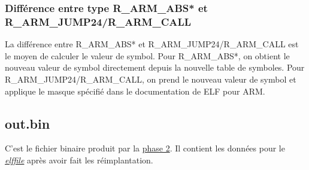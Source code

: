 \documentclass[a4paper]{article} %
\begin{document}
\subsubsection*{Différence entre type R\_ARM\_ABS* et  R\_ARM\_JUMP24/R\_ARM\_CALL}
\label{sec:calc}

La différence entre R\_ARM\_ABS* et R\_ARM\_JUMP24/R\_ARM\_CALL est le moyen de 
calculer le valeur de symbol. Pour R\_ARM\_ABS*, on obtient le nouveau valeur de 
symbol directement depuis la nouvelle table de symboles. Pour 
R\_ARM\_JUMP24/R\_ARM\_CALL, on prend le nouveau valeur de symbol et applique le 
masque spécifié dans le documentation de ELF pour ARM. 

\subsection{out.bin}
\label{sec:bin}
C'est le fichier binaire produit par la \hyperref[sec:phase2]{phase 2}. Il 
contient les données pour le \hyperref[sec:elffile]{\textit{elffile}} après avoir fait 
les réimplantation. 
\end{document}
